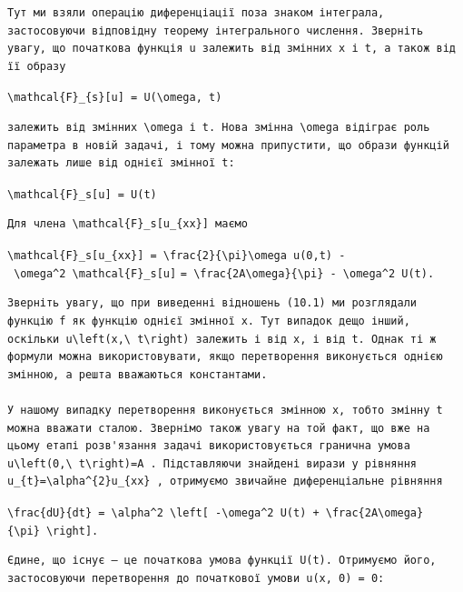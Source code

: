 \documentclass[
  ukrainian,
]{article}
\begin{document}
\begin{verbatim}
Тут ми взяли операцію диференціації поза знаком інтеграла, застосовуючи відповідну теорему інтегрального числення. Зверніть увагу, що початкова функція u залежить від змінних x і t, а також від її образу
\end{verbatim}

\texttt{\textbackslash{}mathcal\{F\}\_\{s\}{[}u{]}\ =\ U(\textbackslash{}omega,\ t)}

\begin{verbatim}
залежить від змінних \omega і t. Нова змінна \omega відіграє роль параметра в новій задачі, і тому можна припустити, що образи функцій залежать лише від однієї змінної t:
\end{verbatim}

\texttt{\textbackslash{}mathcal\{F\}\_s{[}u{]}\ =\ U(t)}

\begin{verbatim}
Для члена \mathcal{F}_s[u_{xx}] маємо
\end{verbatim}

\texttt{\textbackslash{}mathcal\{F\}\_s{[}u\_\{xx\}{]}\ =\ \textbackslash{}frac\{2\}\{\textbackslash{}pi\}\textbackslash{}omega\ u(0,t)\ -\ \textbackslash{}omega\^{}2\ \textbackslash{}mathcal\{F\}\_s{[}u{]}}
\texttt{=\ \textbackslash{}frac\{2A\textbackslash{}omega\}\{\textbackslash{}pi\}\ -\ \textbackslash{}omega\^{}2\ U(t).}

\begin{verbatim}
Зверніть увагу, що при виведенні відношень (10.1) ми розглядали функцію f як функцію однієї змінної x. Тут випадок дещо інший, оскільки u\left(x,\ t\right) залежить і від x, і від t. Однак ті ж формули можна використовувати, якщо перетворення виконується однією змінною, а решта вважаються константами.

У нашому випадку перетворення виконується змінною x, тобто змінну t можна вважати сталою. Звернімо також увагу на той факт, що вже на цьому етапі розв'язання задачі використовується гранична умова u\left(0,\ t\right)=A . Підставляючи знайдені вирази у рівняння u_{t}=\alpha^{2}u_{xx} , отримуємо звичайне диференціальне рівняння
\end{verbatim}

\texttt{\textbackslash{}frac\{dU\}\{dt\}\ =\ \textbackslash{}alpha\^{}2\ \textbackslash{}left{[}\ -\textbackslash{}omega\^{}2\ U(t)\ +\ \textbackslash{}frac\{2A\textbackslash{}omega\}\{\textbackslash{}pi\}\ \textbackslash{}right{]}.}

\begin{verbatim}
Єдине, що існує — це початкова умова функції U(t). Отримуємо його, застосовуючи перетворення до початкової умови u(x, 0) = 0:
\end{verbatim}
\end{document}
